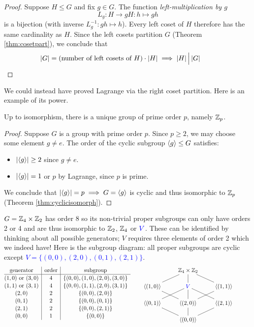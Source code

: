 \begin{proof}
	Suppose $H\le G$ and fix $g\in G$. The function \emph{left-multiplication by $g$}
	\[
		L_g:H\to gH:h\mapsto gh
	\]
	is a bijection (with inverse $L_g^{-1}:gh\mapsto h$). Every left coset of $H$ therefore has the same cardinality as $H$. Since the left cosets partition $G$ (Theorem \ref{thm:cosetpart}), we conclude that
	\[
		\left| G\right|=\text{(number of left cosets of $H$)}\cdot \left| H\right|
		\implies \left| H\right|\Big\vert \left| G\right|
		\tag*{\qedhere}
	\]
\end{proof}


We could instead have proved Lagrange via the right coset partition. Here is an example of its power.

\begin{cor}{}{}
	Up to isomorphism, there is a unique group of prime order $p$, namely $\mathbb{Z}_p$.
\end{cor}

\begin{proof}
	Suppose $G$ is a group with prime order $p$. Since $p\ge 2$, we may choose some element $g\neq e$. The order of the cyclic subgroup $\left\langle g\right\rangle\le G$ satisfies:
	\begin{itemize}%
	  \item $\left| \left\langle g\right\rangle\right|\ge 2$ since $g\neq e$.
	  \item $\left| \left\langle g\right\rangle\right|=1$ or $p$ by Lagrange, since $p$ is prime.
	\end{itemize}
	We conclude that $\left| \left\langle g\right\rangle\right|=p\implies G=\left\langle g\right\rangle$ is cyclic and thus isomorphic to $\mathbb{Z}_p$ (Theorem \ref{thm:cyclicisomorph}).
\end{proof}

\begin{example}{}{}
	$G=\mathbb{Z}_4\times\mathbb{Z}_2$ has order 8 so its non-trivial proper subgroups can only have orders 2 or 4 and are thus isomorphic to $\mathbb{Z}_2$, $\mathbb{Z}_4$ or $\textcolor{blue}{V}$. These can be identified by thinking about all possible generators; $V$ requires three elements of order 2 which we indeed have! Here is the subgroup diagram: all proper subgroups are cyclic except \textcolor{blue}{$V=\{(0,0),(2,0),(0,1),(2,1)\}$}.
	\[
		\def\arraystretch{1.1}
		\begin{array}[t]{@{}c|c|c}
			\text{generator}&\text{order}&\text{subgroup}\\\hline
			(1,0)\text{ or }(3,0) & 4 & \{(0,0),(1,0),(2,0),(3,0)\}\\
			(1,1)\text{ or }(3,1) & 4 & \{(0,0),(1,1),(2,0),(3,1)\}\\
			(2,0) & 2 & \{(0,0),(2,0)\}\\
			(0,1) & 2 & \{(0,0),(0,1)\}\\
			(2,1) & 2 & \{(0,0),(2,1)\}\\
			(0,0) & 1 & \{(0,0)\}
		\end{array}
		\qquad
		\xymatrix @R13pt{%
			&\Z_4\times\Z_2 \ar@/_0pc/@{-}[dl] \ar@{-}[d] \ar@{-}[dr]&\\
			\ip{(1,0)} \ar@{-}[dr] & \textcolor{blue}{V} \ar@{-}[dl] \ar@{-}[d] \ar@{-}[dr] & \ip{(1,1)} \ar@{-}[dl]\\
			\ip{(0,1)} \ar@{-}[dr] & \ip{(2,0)} \ar@{-}[d] & \ip{(2,1)} \ar@{-}[dl] &\\
			&\ip{(0,0)}&
		}
	\]
\end{example}



